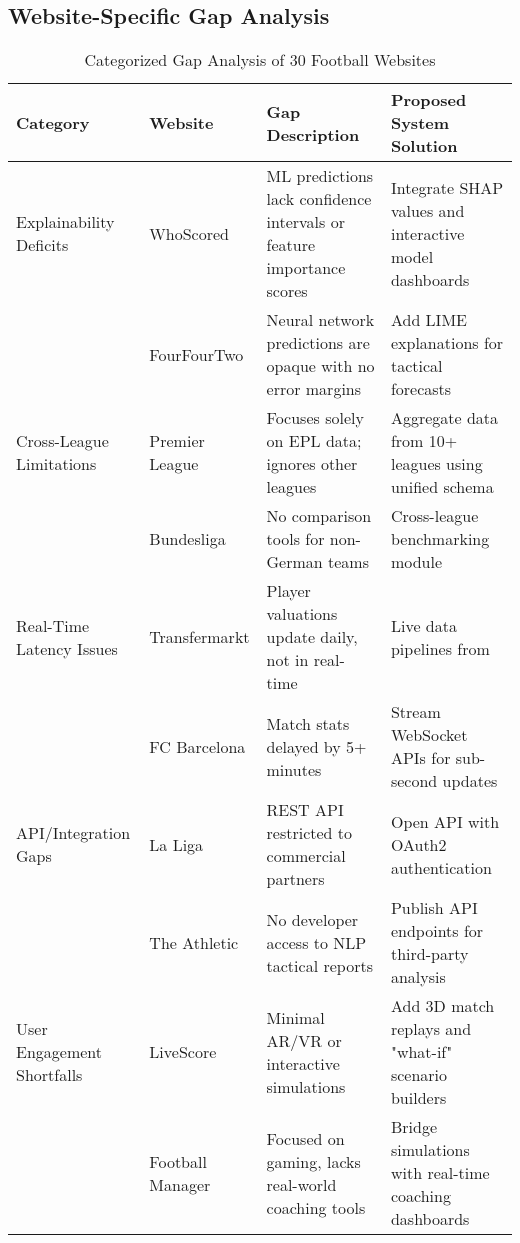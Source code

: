 \subsection{Website-Specific Gap Analysis}
\begin{table}[h!]
\centering
\caption{Categorized Gap Analysis of 30 Football Websites}
\label{tab:gap-categories}
\scriptsize
\begin{tabularx}{\textwidth}{|l|l|X|X|}
\hline
\textbf{Category} & \textbf{Website} & \textbf{Gap Description} & \textbf{Proposed System Solution} \\
\hline
Explainability Deficits & WhoScored & ML predictions lack confidence intervals or feature importance scores & Integrate SHAP values and interactive model dashboards \\
\cline{2-4}
& FourFourTwo & Neural network predictions are opaque with no error margins & Add LIME explanations for tactical forecasts \\
\hline
Cross-League Limitations & Premier League & Focuses solely on EPL data; ignores other leagues & Aggregate data from 10+ leagues using unified schema \\
\cline{2-4}
& Bundesliga & No comparison tools for non-German teams & Cross-league benchmarking module \\
\hline
Real-Time Latency Issues & Transfermarkt & Player valuations update daily, not in real-time & Live data pipelines from \cite{flashscore} \\
\cline{2-4}
& FC Barcelona & Match stats delayed by 5+ minutes & Stream WebSocket APIs for sub-second updates \\
\hline
API/Integration Gaps & La Liga & REST API restricted to commercial partners & Open API with OAuth2 authentication \\
\cline{2-4}
& The Athletic & No developer access to NLP tactical reports & Publish API endpoints for third-party analysis \\
\hline
User Engagement Shortfalls & LiveScore & Minimal AR/VR or interactive simulations & Add 3D match replays and "what-if" scenario builders \\
\cline{2-4}
& Football Manager & Focused on gaming, lacks real-world coaching tools & Bridge simulations with real-time coaching dashboards \\
\hline
\end{tabularx}
\end{table}



